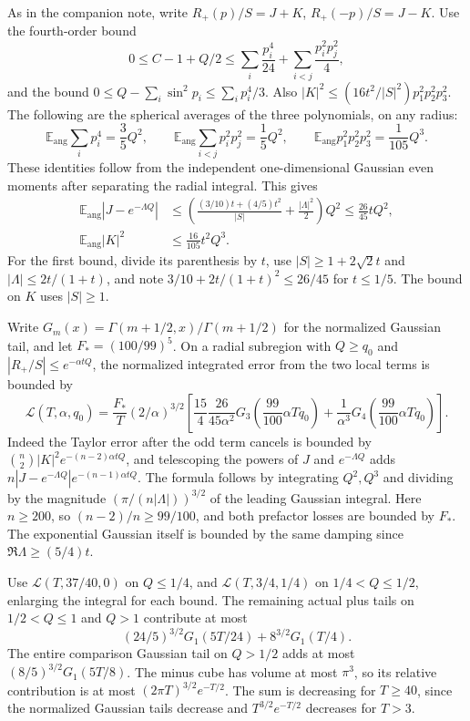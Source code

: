 \documentclass[11pt]{article}
\begin{document}
As in the companion note, write $R_+(p)/S=J+K$, $R_+(-p)/S=J-K$. Use the fourth-order bound
\[
0\le C-1+Q/2\le
\sum_i\frac{p_i^4}{24}+\sum_{i<j}\frac{p_i^2p_j^2}{4},
\]
and the bound $0\le Q-\sum_i\sin^2p_i\le\sum_i p_i^4/3$. Also $|K|^2\le(16t^2/|S|^2)p_1^2p_2^2p_3^2$. The following are the spherical averages of the three polynomials, on any radius:
\[
\mathbb E_\mathrm{ang}\sum_i p_i^4=\frac35 Q^2,\qquad
\mathbb E_\mathrm{ang}\sum_{i<j}p_i^2p_j^2=\frac15 Q^2,\qquad
\mathbb E_\mathrm{ang}p_1^2p_2^2p_3^2=\frac1{105}Q^3.
\]
These identities follow from the independent one-dimensional Gaussian even moments after separating the radial integral. This gives
\[
\begin{aligned}
\mathbb E_\mathrm{ang}|J-e^{-\Lambda Q}|
&\le \left(\frac{(3/10)t+(4/5)t^2}{|S|}
+\frac{|\Lambda|^2}{2}\right)Q^2
\le\frac{26}{45}tQ^2,\\
\mathbb E_\mathrm{ang}|K|^2&\le\frac{16}{105}t^2 Q^3.
\end{aligned}
\]
For the first bound, divide its parenthesis by $t$, use $|S|\ge1+2\sqrt2t$ and $|\Lambda|\le2t/(1+t)$, and note $3/10+2t/(1+t)^2\le26/45$ for $t\le1/5$. The bound on $K$ uses $|S|\ge1$.

Write $G_m(x)=\Gamma(m+1/2,x)/\Gamma(m+1/2)$ for the normalized Gaussian tail, and let $F_*=(100/99)^5$. On a radial subregion with $Q\ge q_0$ and $|R_+/S|\le e^{-\alpha t Q}$, the normalized integrated error from the two local terms is bounded by
\[
\mathcal L(T,\alpha,q_0)=
\frac{F_*}{T}(2/\alpha)^{3/2}
\left[
\frac{15}{4}\frac{26}{45\alpha^2}
G_3\!\left(\frac{99}{100}\alpha Tq_0\right)
+\frac1{\alpha^3}
G_4\!\left(\frac{99}{100}\alpha Tq_0\right)
\right].
\]
Indeed the Taylor error after the odd term cancels is bounded by $\binom n2|K|^2 e^{-(n-2)\alpha tQ}$, and telescoping the powers of $J$ and $e^{-\Lambda Q}$ adds $n|J-e^{-\Lambda Q}|e^{-(n-1)\alpha tQ}$. The formula follows by integrating $Q^2,Q^3$ and dividing by the magnitude $(\pi/(n|\Lambda|))^{3/2}$ of the leading Gaussian integral. Here $n\ge200$, so $(n-2)/n\ge99/100$, and both prefactor losses are bounded by $F_*$. The exponential Gaussian itself is bounded by the same damping since $\Re\Lambda\ge (5/4)t$.

Use $\mathcal L(T,37/40,0)$ on $Q\le1/4$, and $\mathcal L(T,3/4,1/4)$ on $1/4<Q\le1/2$, enlarging the integral for each bound. The remaining actual plus tails on $1/2<Q\le1$ and $Q>1$ contribute at most
\[
(24/5)^{3/2}G_1(5T/24)+8^{3/2}G_1(T/4).
\]
The entire comparison Gaussian tail on $Q>1/2$ adds at most $(8/5)^{3/2}G_1(5T/8)$. The minus cube has volume at most $\pi^3$, so its relative contribution is at most $(2\pi T)^{3/2}e^{-T/2}$. The sum is decreasing for $T\ge40$, since the normalized Gaussian tails decrease and $T^{3/2}e^{-T/2}$ decreases for $T>3$.
\end{document}
